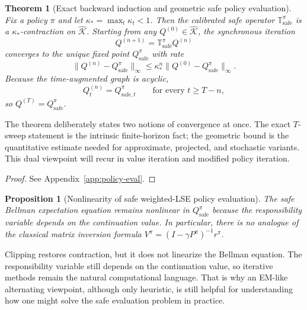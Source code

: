 \documentclass{article}
\newtheorem{theorem}{Theorem}[section]
\newtheorem{proposition}[proposition]{Proposition}
\theoremstyle{remark}
\newcommand{\safe}{\mathrm{safe}}
\newcommand{\Ksafe}{\widehat{\mathcal K}}
\begin{document}
\begin{theorem}[Exact backward induction and geometric safe policy evaluation]
\label{thm:policy-eval}
Fix a policy $\pi$ and let $\kappa_* = \max_t \kappa_t <1$.
Then the calibrated safe operator $\mathbb T_\safe^\pi$ is a $\kappa_*$-contraction on $\Ksafe$.
Starting from any $Q^{(0)}\in\Ksafe$, the synchronous iteration
\begin{equation}
Q^{(n+1)} = \mathbb T_\safe^\pi Q^{(n)}
\label{eq:safe-policy-eval-iter}
\end{equation}
converges to the unique fixed point $Q_\safe^\pi$ with rate
\begin{equation}
\|Q^{(n)}-Q_\safe^\pi\|_\infty
\le
\kappa_*^n\|Q^{(0)}-Q_\safe^\pi\|_\infty.
\label{eq:safe-policy-eval-rate}
\end{equation}
Because the time-augmented graph is acyclic,
\begin{equation}
Q_t^{(n)} = Q_{\safe,t}^\pi
\qquad\text{for every } t\ge T-n,
\label{eq:safe-tail-exact}
\end{equation}
so $Q^{(T)}=Q_\safe^\pi$.
\end{theorem}

The theorem deliberately states two notions of convergence at once.
The exact $T$-sweep statement is the intrinsic finite-horizon fact; the geometric bound is the quantitative estimate needed for approximate, projected, and stochastic variants.
This dual viewpoint will recur in value iteration and modified policy iteration.

\begin{proof}
See Appendix~\ref{app:policy-eval}.
\end{proof}

\begin{proposition}[Nonlinearity of safe weighted-LSE policy evaluation]
\label{prop:nonlinear}
The safe Bellman expectation equation remains nonlinear in $Q_\safe^\pi$ because the responsibility variable depends on the continuation value.
In particular, there is no analogue of the classical matrix inversion formula $V^\pi=(I-\gamma P^\pi)^{-1}r^\pi$.
\end{proposition}

Clipping restores contraction, but it does not linearize the Bellman equation.
The responsibility variable still depends on the continuation value, so iterative methods remain the natural computational language.
That is why an EM-like alternating viewpoint, although only heuristic, is still helpful for understanding how one might solve the safe evaluation problem in practice.
\end{document}
